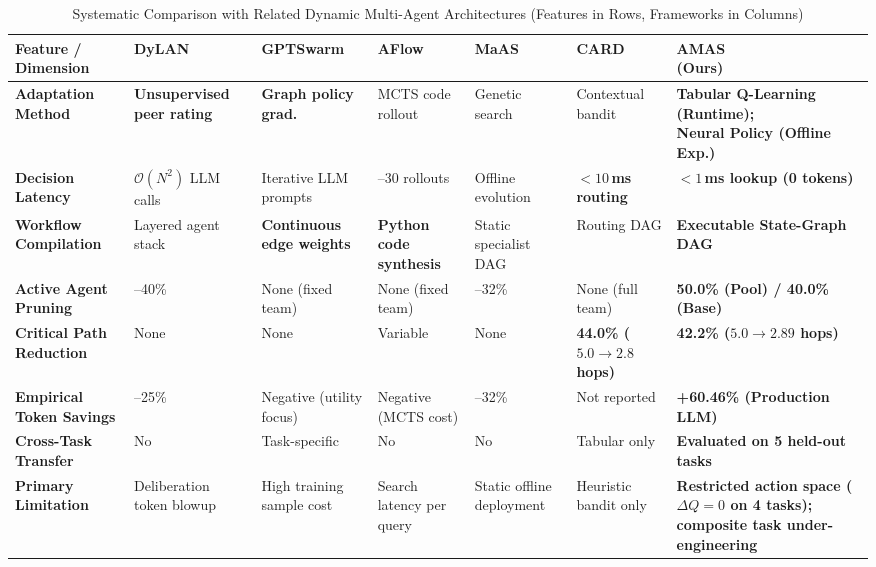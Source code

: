 \documentclass[conference]{IEEEtran}
\makeatletter
\providecommand{\makecell}[2][c]{\begin{tabular}[#1]{@{}#1@{}}#2\end{tabular}}
\makeatother
\begin{document}
\begin{table}[!t]
\centering
\caption{Systematic Comparison with Related Dynamic Multi-Agent Architectures (Features in Rows, Frameworks in Columns)}
\label{tab:literature_comparison}
\footnotesize
\setlength{\tabcolsep}{2.5pt}
\renewcommand{\arraystretch}{1.04}
\begin{tabularx}{\textwidth}{>{\raggedright\arraybackslash\bfseries}p{2.85cm} *{5}{>{\raggedright\arraybackslash\hyphenpenalty=10000\hsize=0.86\hsize}X} >{\raggedright\arraybackslash\hyphenpenalty=10000\hsize=1.70\hsize\bfseries}X}
\toprule
\makecell[c]{\textbf{Feature /}\\\textbf{Dimension}} & 
\makecell[c]{\textbf{DyLAN}\\\cite{liu2024dylan}} & 
\makecell[c]{\textbf{GPTSwarm}\\\cite{zhuge2024gptswarm}} & 
\makecell[c]{\textbf{AFlow}\\\cite{zhang2024aflow}} & 
\makecell[c]{\textbf{MaAS}\\\cite{Zhang2025MaAS}} & 
\makecell[c]{\textbf{CARD}\\\cite{Li2025AdaptiveGraphPruning}} & 
\makecell[c]{\textbf{AMAS}\\\textbf{(Ours)}} \\
\midrule
Adaptation Method & 
\textbf{Unsupervised peer rating} & 
\textbf{Graph policy grad.} & 
MCTS code rollout & 
Genetic search & 
Contextual bandit & 
\makecell[l]{\textbf{Tabular Q-Learning (Runtime);}\\\textbf{Neural Policy (Offline Exp.)}} \\
Decision Latency & 
$\mathcal{O}(N^2)$ LLM calls & 
Iterative LLM prompts & 
15--30 rollouts & 
Offline evolution & 
\textbf{$<10$\,ms routing} & 
$<1$\,ms lookup (0 tokens) \\
Workflow Compilation & 
Layered agent stack & 
\textbf{Continuous edge weights} & 
\textbf{Python code synthesis} & 
Static specialist DAG & 
Routing DAG & 
Executable State-Graph DAG \\
Active Agent Pruning & 
25--40\% & 
None (fixed team) & 
None (fixed team) & 
18--32\% & 
None (full team) & 
50.0\% (Pool) / 40.0\% (Base) \\
Critical Path Reduction & 
None & 
None & 
Variable & 
None & 
\textbf{44.0\% ($5.0 \to 2.8$ hops)} & 
42.2\% ($5.0 \to 2.89$ hops) \\
Empirical Token Savings & 
15--25\% & 
Negative (utility focus) & 
Negative (MCTS cost) & 
18--32\% & 
Not reported & 
+60.46\% (Production LLM) \\
Cross-Task Transfer & 
No & 
Task-specific & 
No & 
No & 
Tabular only & 
Evaluated on 5 held-out tasks \\
Primary Limitation & 
Deliberation token blowup & 
High training sample cost & 
Search latency per query & 
Static offline deployment & 
Heuristic bandit only & 
Restricted action space ($\Delta Q = 0$ on 4 tasks); composite task under-engineering \\
\bottomrule
\end{tabularx}
\end{table}
\end{document}
